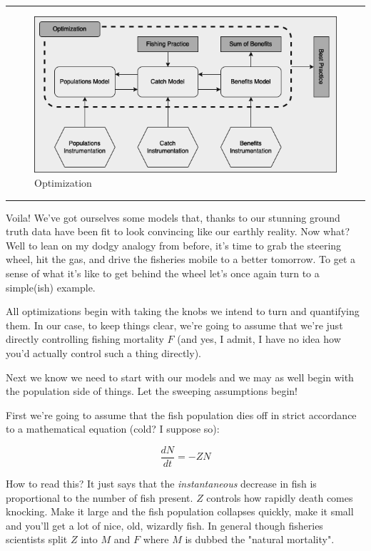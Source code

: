 \documentclass[11pt,a5paper]{book}
\begin{document}
\noindent \rule{\textwidth}{0.5pt} 
\begin{figure}[h!] 
  \includegraphics[width=\linewidth]{drawings/high_level_optimization.png}
  \caption{Optimization}
  \label{fig:high_level_optimization}
\end{figure}
\newline
\rule{\textwidth}{0.5pt} 
\vspace{5pt}

Voila! We've got ourselves some models that, thanks to our stunning ground truth data have been fit to look convincing like our earthly reality. Now what? Well to lean on my dodgy analogy from before, it's time to grab the steering wheel, hit the gas, and drive the fisheries mobile to a better tomorrow. To get a sense of what it's like to get behind the wheel let's once again turn to a simple(ish) example. 
\newline

All optimizations begin with taking the knobs we intend to turn and quantifying them. In our case, to keep things clear, we're going to assume that we're just directly controlling fishing mortality $F$ (and yes, I admit, I have no idea how you'd actually control such a thing directly). 
\newline

Next we know we need to start with our models and we may as well begin with the population side of things. Let the sweeping assumptions begin!
\newline

First we're going to assume that the fish population dies off in strict accordance to a mathematical equation (cold? I suppose so):

$$\frac{dN}{dt}=-ZN$$

How to read this? It just says that the \textit{instantaneous} decrease in fish is proportional to the number of fish present. $Z$ controls how rapidly death comes knocking. Make it large and the fish population collapses quickly, make it small and you'll get a lot of nice, old, wizardly fish. In general though fisheries scientists split $Z$ into $M$ and $F$ where $M$ is dubbed the "natural mortality". 
\newline
\end{document}
